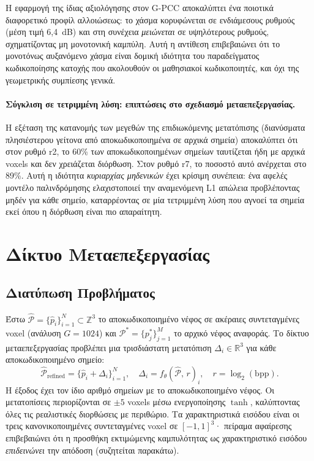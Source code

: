 Η εφαρμογή της ίδιας αξιολόγησης στον G-PCC αποκαλύπτει ένα ποιοτικά διαφορετικό
προφίλ αλλοιώσεως: το χάσμα κορυφώνεται σε ενδιάμεσους ρυθμούς (μέση τιμή 6,4~dB)
και στη συνέχεια \emph{μειώνεται} σε υψηλότερους ρυθμούς, σχηματίζοντας μη μονοτονική
καμπύλη.
Αυτή η αντίθεση επιβεβαιώνει ότι το μονοτόνως αυξανόμενο χάσμα είναι δομική ιδιότητα
του παραδείγματος κωδικοποίησης κατοχής που ακολουθούν οι μαθησιακοί κωδικοποιητές,
και όχι της γεωμετρικής συμπίεσης γενικά.

\paragraph{Σύγκλιση σε τετριμμένη λύση: επιπτώσεις στο σχεδιασμό μεταεπεξεργασίας.}
Η εξέταση της κατανομής των μεγεθών της επιδιωκόμενης μετατόπισης (διανύσματα
πλησιέστερου γείτονα από αποκωδικοποιημένα σε αρχικά σημεία) αποκαλύπτει ότι στον
ρυθμό r2, το 60\% των αποκωδικοποιημένων σημείων ταυτίζεται ήδη με αρχικά voxels
και δεν χρειάζεται διόρθωση.
Στον ρυθμό r7, το ποσοστό αυτό ανέρχεται στο 89\%.
Αυτή η ιδιότητα \emph{κυριαρχίας μηδενικών} έχει κρίσιμη συνέπεια: ένα αφελές
μοντέλο παλινδρόμησης ελαχιστοποιεί την αναμενόμενη L1 απώλεια προβλέποντας μηδέν
για κάθε σημείο, καταρρέοντας σε μία τετριμμένη λύση που αγνοεί τα σημεία εκεί όπου
η διόρθωση είναι πιο απαραίτητη.

\section{Δίκτυο Μεταεπεξεργασίας}

\subsection{Διατύπωση Προβλήματος}

Έστω $\hat{\mathcal{P}} = \{\hat{p}_i\}_{i=1}^{N} \subset \mathbb{Z}^3$ το
αποκωδικοποιημένο νέφος σε ακέραιες συντεταγμένες voxel (ανάλυση $G=1024$) και
$\mathcal{P}^* = \{p^*_j\}_{j=1}^{M}$ το αρχικό νέφος αναφοράς.
Το δίκτυο μεταεπεξεργασίας προβλέπει μια τρισδιάστατη μετατόπιση
$\Delta_i \in \mathbb{R}^3$ για κάθε αποκωδικοποιημένο σημείο:
\[
  \hat{\mathcal{P}}_{\mathrm{refined}}
    = \bigl\{\hat{p}_i + \Delta_i\bigr\}_{i=1}^{N},
  \quad
  \Delta_i = f_\theta(\hat{\mathcal{P}},\,r)_i,
  \quad r = \log_2(\mathrm{bpp}).
\]
Η έξοδος έχει τον ίδιο αριθμό σημείων με το αποκωδικοποιημένο νέφος.
Οι μετατοπίσεις περιορίζονται σε ${\pm}5$ voxels μέσω ενεργοποίησης $\tanh$,
καλύπτοντας όλες τις ρεαλιστικές διορθώσεις με περιθώριο.
Τα χαρακτηριστικά εισόδου είναι οι τρεις κανονικοποιημένες συντεταγμένες voxel
σε $[-1,1]^3$· πείραμα αφαίρεσης επιβεβαιώνει ότι η προσθήκη εκτιμώμενης
καμπυλότητας ως χαρακτηριστικό εισόδου \emph{επιδεινώνει} την απόδοση
(συζητείται παρακάτω).

